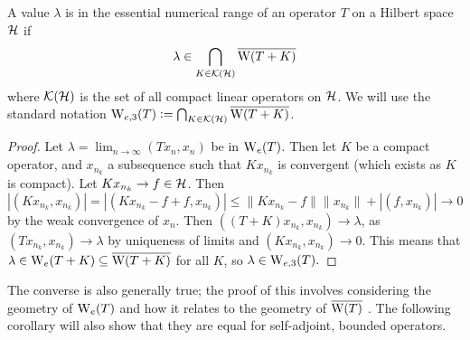 \documentclass[../main.tex]{subfiles}
\begin{document}
\begin{theorem}
\label{thm:ess-ran-compact-ptb}
  A value $\lambda$ is in the essential numerical range of an operator $T$ on a
  Hilbert space $\mathcal{H}$ if
    $$\lambda \in \bigcap_{K \in \mathcal{K}(\mathcal{H})} \overline{\mathrm{W}(T+K)}$$
  where $\mathcal{K}(\mathcal{H})$ is the set of all compact linear operators on $\mathcal{H}$.
  We will use the standard notation
  $\mathrm{W}_{e,3}(T) \mathrel{\mathop:}= \bigcap_{K \in \mathcal{K}(\mathcal{H})} \overline{\mathrm{W}(T+K)}$. 
\end{theorem}
\begin{proof}
Let $\lambda = \lim_{n \rightarrow \infty}(Tx_n, x_n)$ be in $\mathrm{W}_e(T)$. Then
let $K$ be a compact operator, and $x_{n_k}$ a subsequence such that $Kx_{n_k}$
is convergent (which exists as $K$ is compact). Let $Kx_{n_k} \rightarrow f \in \mathcal{H}$. Then
  $$|(Kx_{n_k}, x_{n_k})| = |(Kx_{n_k} - f + f, x_{n_k})| 
    \leq \|Kx_{n_k} - f\|\|x_{n_k}\| + |(f, x_{n_k})| \rightarrow 0$$
by the weak convergence of $x_n$. Then $((T+K)x_{n_k}, x_{n_k}) \rightarrow \lambda$, as
$(Tx_{n_k}, x_{n_k}) \rightarrow \lambda$ by uniqueness of limits and 
$(Kx_{n_k}, x_{n_k}) \rightarrow 0$. This means that
$\lambda \in \mathrm{W}_e(T+K) \subseteq \overline{\mathrm{W}(T+K)}$ for all $K$, so $\lambda \in \mathrm{W}_{e,3}(T).$
\end{proof}
The converse is also generally true; the proof of this involves considering the geometry of
$\mathrm{W}_e(T)$ and how it relates to the geometry of $\overline{\mathrm{W}(T)}$ \cite{bogli2020essential}.
The following corollary will also show that they are equal for self-adjoint, bounded operators.
\end{document}
